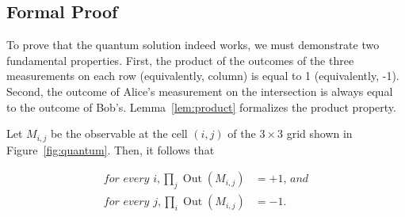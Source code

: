 \documentclass{llncs}
\begin{document}
\subsection{Formal Proof}\label{sec:msquare-proof}
To prove that the quantum solution indeed works, we must demonstrate
two fundamental properties. First, the product of the outcomes of the
three measurements on each row (equivalently, column) is equal to 1
(equivalently, -1). Second, the outcome of Alice's measurement on the
intersection is always equal to the outcome of
Bob's. Lemma~\ref{lem:product} formalizes the product property.

\begin{lemma}
  \label{lem:product}
  Let \(M_{i, j}\) be the observable at the cell \((i, j)\) of the
  \(3 \times 3\) grid shown in Figure~\ref{fig:quantum}. Then,
  it follows that

  \begin{align}
    \textit{for every }i, \prod_{j} \operatorname{Out}(M_{i, j}) &= +1  \textit{, and} \\
    \textit{for every }j, \prod_{i} \operatorname{Out}(M_{i, j}) &= -1.
  \end{align}
\end{lemma}
\end{document}

